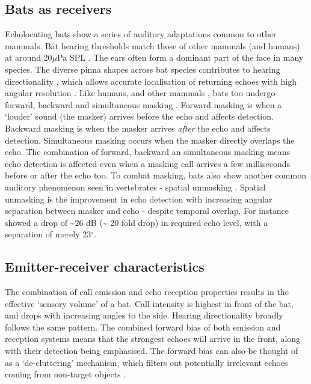 \documentclass[
]{book}
\begin{document}
\hypertarget{bats-as-receivers}{%
\subsection{Bats as receivers}\label{bats-as-receivers}}

Echolocating bats show a series of auditory adaptations common to other mammals. Bat hearing thresholds match those of other mammals (and humans) at around 20\(\mu\)Pa SPL \citep{wahlberg2014sound}. The ears often form a dominant part of the face in many species. The diverse pinna shapes across bat species contributes to hearing directionality \citep{obrist1993a}, which allows accurate localisation of returning echoes with high angular resolution \citep{Moss1995}. Like humans, and other mammals , bats too undergo forward, backward and simultaneous masking \citep{m1989a, siewert2004a, suemer2009a}. Forward masking is when a `louder' sound (the masker) arrives before the echo and affects detection. Backward masking is when the masker arrives \emph{after} the echo and affects detection. Simultaneous masking occurs when the masker directly overlaps the echo. The combination of forward, backward an simultaneous masking means echo detection is affected even when a masking call arrives a few milliseconds before or after the echo too. To combat masking, bats also show another common auditory phenomenon seen in vertebrates - spatial unmasking \citep{suemer2009a, geberl2019spatial}. Spatial unmasking is the improvement in echo detection with increasing angular separation between masker and echo - despite temporal overlap. For instance \citet{suemer2009a} showed a drop of \textasciitilde26 dB (\textasciitilde{} 20 fold drop) in required echo level, with a separation of merely 23\(^{\circ}\).

\hypertarget{emitter-receiver-characteristics}{%
\subsection{Emitter-receiver characteristics}\label{emitter-receiver-characteristics}}

The combination of call emission and echo reception properties results in the effective `sensory volume' \citep{nelson2006a} of a bat. Call intensity is highest in front of the bat, and drops with increasing angles to the side. Hearing directionality broadly follows the same pattern. The combined forward bias of both emission and reception systems means that the strongest echoes will arrive in the front, along with their detection being emphasised. The forward bias can also be thought of as a `de-cluttering' mechanism, which filters out potentially irrelevant echoes coming from non-target objects \citep{simmons2012biosonar}.
\end{document}
